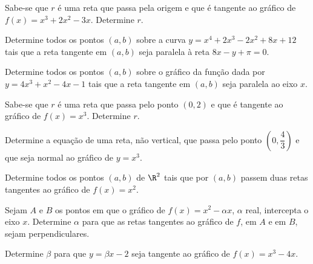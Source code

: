 \begin{exercicio}[7]
\label{ex:7.16.7}
Sabe-se que $r$ é uma reta que passa pela origem e que é tangente ao gráfico de $f(x) = x^3 + 2x^2 - 3x$. Determine $r$.
\end{exercicio}

\begin{exercicio}[8]
\label{ex:7.16.8}
Determine todos os pontos $(a, b)$ sobre a curva $y = x^4 + 2x^3 - 2x^2 + 8x + 12$ tais que a reta tangente em $(a, b)$ seja paralela à reta $8x - y + \pi = 0$.
\end{exercicio}

\begin{exercicio}[9]
\label{ex:7.16.9}
Determine todos os pontos $(a, b)$ sobre o gráfico da função dada por $y = 4x^3 + x^2 - 4x - 1$ tais que a reta tangente em $(a, b)$ seja paralela ao eixo $x$.
\end{exercicio}

\begin{exercicio}[10]
\label{ex:7.16.10}
Sabe-se que $r$ é uma reta que passa pelo ponto $(0, 2)$ e que é tangente ao gráfico de $f(x) = x^3$. Determine $r$.
\end{exercicio}

\begin{exercicio}[11]
\label{ex:7.16.11}
Determine a equação de uma reta, não vertical, que passa pelo ponto $\left(0, \dfrac{4}{3}\right)$ e que seja normal ao gráfico de $y = x^3$.
\end{exercicio}

\begin{exercicio}[12]
\label{ex:7.16.12}
Determine todos os pontos $(a, b)$ de $\R^2$ tais que por $(a, b)$ passem duas retas tangentes ao gráfico de $f(x) = x^2$.
\end{exercicio}

\begin{exercicio}[13]
\label{ex:7.16.13}
Sejam $A$ e $B$ os pontos em que o gráfico de $f(x) = x^2 - \alpha x$, $\alpha$ real, intercepta o eixo $x$. Determine $\alpha$ para que as retas tangentes ao gráfico de $f$, em $A$ e em $B$, sejam perpendiculares.
\end{exercicio}

\begin{exercicio}[14]
\label{ex:7.16.14}
Determine $\beta$ para que $y = \beta x - 2$ seja tangente ao gráfico de $f(x) = x^3 - 4x$.
\end{exercicio}

